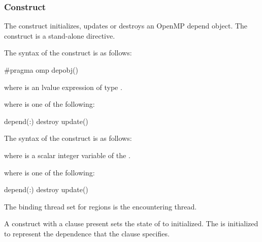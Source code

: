 \subsubsection{ Construct}
\label{subsubsec:depobj Construct}
\summary
The  construct initializes, updates or destroys an OpenMP depend 
object. The  construct is a stand-alone directive.

\syntax

\begin{ccppspecific}
\begin{samepage}
The syntax of the  construct is as follows:

\begin{ompcPragma}
#pragma omp depobj() 
\end{ompcPragma}
\end{samepage}
where  is an lvalue expression of type .

where  is one of the following{}:

\begin{indentedcodelist}
depend(:)
destroy
update()
\end{indentedcodelist}
\end{ccppspecific}

\begin{fortranspecific}
The syntax of the  construct is as follows:

where  is a scalar integer variable of the  .

where  is one of the following{}:

\begin{indentedcodelist}
depend(:)
destroy
update()
\end{indentedcodelist}
\end{fortranspecific}

\binding
The binding thread set for  regions is the encountering thread.

\descr
A  construct with a  clause present sets the state 
of  to initialized. The  is initialized to represent 
the dependence that the  clause specifies.

